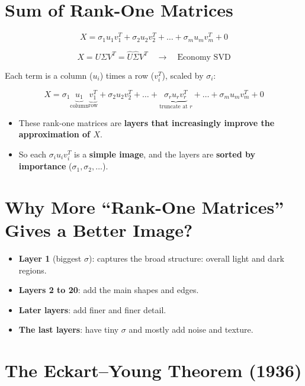 \documentclass[11pt,a4paper]{article}
\begin{document}
\section{Sum of Rank-One Matrices}

\[
  X = \sigma_1 u_1 v_1^T + \sigma_2 u_2 v_2^T + \dots + \sigma_m u_m v_m^T + 0
\]

\[
  X = U \Sigma V^T = \hat{U} \hat{\Sigma} V^T \quad \rightarrow \quad \text{Economy SVD}
\]

Each term is a column ($u_i$) times a row ($v_i^T$), scaled by $\sigma_i$:

\[
  X = \sigma_1 \underbrace{u_1}_{\text{column}} \underbrace{v_1^T}_{\text{row}}
  + \sigma_2 u_2 v_2^T + \dots
  + \underbrace{\sigma_r u_r v_r^T}_{\text{truncate at } r}
  + \dots + \sigma_m u_m v_m^T + 0
\]

\begin{itemize}
  \item These rank-one matrices are \textbf{layers that increasingly improve the approximation of $X$}.
  \item So each $\sigma_i u_i v_i^T$ is a \textbf{simple image}, and the layers are \textbf{sorted by importance} ($\sigma_1, \sigma_2, \dots$).
\end{itemize}

\section{Why More ``Rank-One Matrices'' Gives a Better Image?}

\begin{itemize}
  \item \textbf{Layer 1} (biggest $\sigma$): captures the broad structure: overall light and dark regions.
  \item \textbf{Layers 2 to 20}: add the main shapes and edges.
  \item \textbf{Later layers}: add finer and finer detail.
  \item \textbf{The last layers}: have tiny $\sigma$ and mostly add noise and texture.
\end{itemize}

\section{The Eckart--Young Theorem (1936)}
\end{document}
